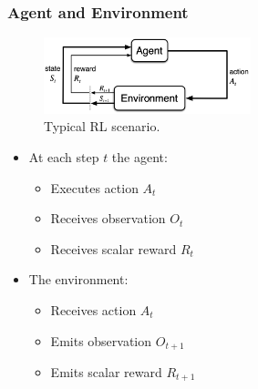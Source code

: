 \documentclass[9pt]{beamer}
\begin{document}


\begin{frame}
\frametitle{Agent and Environment}


\begin{multicols}{2}
	
	\begin{figure}
		\centering
		\includegraphics[width=6cm]{rl-loop.png}
		\caption{Typical RL scenario. \cite{10.5555/3312046}}
		\label{fig:rl-loop}
	\end{figure}
	
	\columnbreak

	\begin{itemize}
		\item At each step $t$ the agent:
		\begin{itemize}
			\item Executes action $A_t$
			\item Receives observation $O_t$
			\item Receives scalar reward $R_t$
		\end{itemize}
	
		\item The environment:
		\begin{itemize}
			\item Receives action $A_t$
			\item Emits observation $O_{t+1}$
			\item Emits scalar reward $R_{t+1}$
		\end{itemize}
	\end{itemize}

\end{multicols}


\end{frame}

\end{document}
